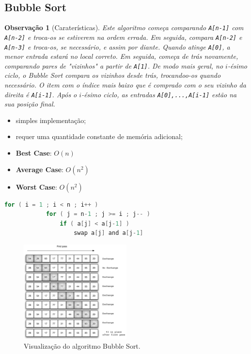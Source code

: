 \documentclass[a4paper, 12pt]{article}
\newtheorem{remark}{Observação}
\begin{document}
\subsection{Bubble Sort}
\begin{remark}[Caraterísticas]
    Este algoritmo começa comparando \texttt{A[n-1]} com \texttt{A[n-2]} e troca-os se estiverem na ordem errada. Em seguida, compara \texttt{A[n-2]} e \texttt{A[n-3]} e troca-os, se necessário, e assim por diante. Quando atinge \texttt{A[0]}, a menor entrada estará no local correto. Em seguida, começa de trás novamente, comparando pares de "vizinhos" a partir de \texttt{A[1]}. De modo mais geral, no $i$-ésimo ciclo, o Bubble Sort compara os vizinhos desde trás, trocandoo-os quando necessário. O item com o índice mais baixo que é comprado com o seu vizinho da direita é \texttt{A[i-1]}. Após o $i$-ésimo ciclo, as entradas \texttt{A[0],...,A[i-1]} estão na sua posição final.\end{remark}
    \begin{itemize}
        \item simples implementação;
        \item requer uma quantidade constante de memória adicional;
        \item \textbf{Best Case}: $O(n)$
        \item \textbf{Average Case}: $O(n^2)$
        \item \textbf{Worst Case}: $O(n^2)$
    \end{itemize}


\begin{center}
    \begin{lstlisting}[frame=single, language=c, caption=Algoritmo Bubble Sort, captionpos=b]
        for ( i = 1 ; i < n ; i++ )
            for ( j = n-1 ; j >= i ; j-- )
                if ( a[j] < a[j-1] )
                    swap a[j] and a[j-1]
    \end{lstlisting}
    
    \begin{figure}[h!]
        \centering
        \includegraphics[width=0.5\textwidth]{fig/ao/bs.png}
        \caption{Visualização do algoritmo Bubble Sort.}
    \end{figure}
\end{center}
\end{document}
